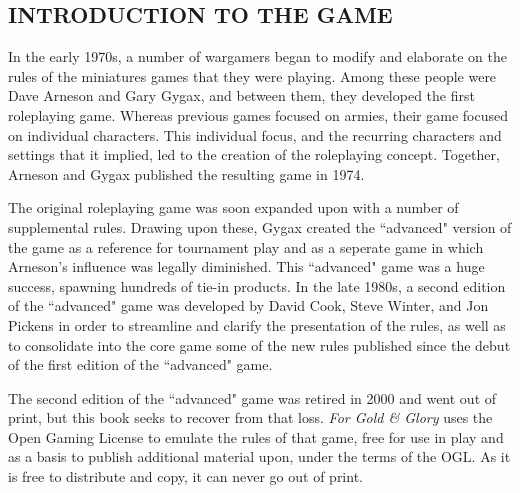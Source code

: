 \begin{multicols}{2}
 
\section{INTRODUCTION TO THE GAME}

In the early 1970s, a number of wargamers began to modify and elaborate on the rules of the miniatures games that they were playing. Among these people were Dave Arneson and Gary Gygax, and between them, they developed the first roleplaying game. Whereas previous games focused on armies, their game focused on individual characters. This individual focus, and the recurring characters and settings that it implied, led to the creation of the roleplaying concept. Together, Arneson and Gygax published the resulting game in 1974.

The original roleplaying game was soon expanded upon with a number of supplemental rules. Drawing upon these, Gygax created the ``advanced" version of the game as a reference for tournament play and as a seperate game in which Arneson's influence was legally diminished. This ``advanced" game was a huge success, spawning hundreds of tie-in products. In the late 1980s, a second edition of the ``advanced" game was developed by David Cook, Steve Winter, and Jon Pickens in order to streamline and clarify the presentation of the rules, as well as to consolidate into the core game some of the new rules published since the debut of the first edition of the ``advanced" game.

The second edition of the ``advanced" game was retired in 2000 and went out of print, but this book seeks to recover from that loss. \textit{For Gold \& Glory}\texttrademark{} uses the Open Gaming License to emulate the rules of that game, free for use in play and as a basis to publish additional material upon, under the terms of the OGL. As it is free to distribute and copy, it can never go out of print. 




\end{multicols}
